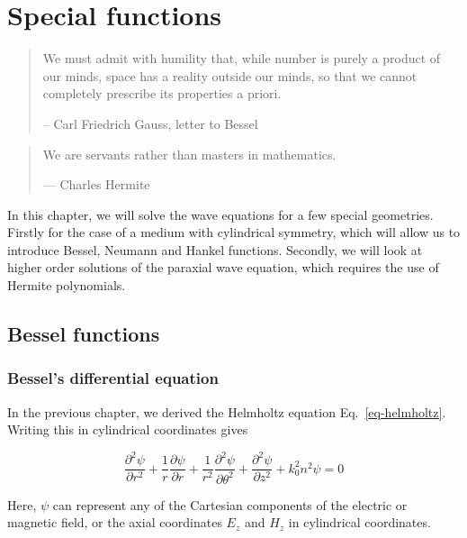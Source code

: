 \setcounter{chapter}{1} %

\chapter{Special functions}
\label{h:special}

\begin{quote}
We must admit with humility that, while number is purely a product of our minds, space has a reality outside our minds, so that we cannot completely prescribe its properties a priori.

-- Carl Friedrich Gauss, letter to Bessel
\end{quote}

\begin{quote}
We are servants rather than masters in mathematics.

--- Charles Hermite
\end{quote}

\minitoc

In this chapter, we will solve the wave equations for a few special geometries. Firstly for the case of a medium with cylindrical symmetry, which will allow us to introduce Bessel, Neumann and Hankel functions. Secondly, we will look at higher order solutions of the paraxial wave equation, which requires the use of Hermite polynomials.

\section{Bessel functions}

\subsection{Bessel's differential equation}\label{sec-bessel-eq}

In the previous chapter, we derived the Helmholtz equation Eq.~\ref{eq-helmholtz}. Writing this in cylindrical coordinates gives

\begin{equation}
\frac{\partial^2 \psi}{\partial r^2} + \frac{1}{r} \frac{\partial \psi}{\partial r} +\frac{1}{r^2} \frac{\partial^2 \psi}{\partial \theta^2} + \frac{\partial^2 \psi}{\partial z^2} + k_0^2 n^2\psi = 0 \label{eq-helmholtz-cyl}
\end{equation}

Here, $\psi$ can represent any of the Cartesian components of the electric or magnetic field, or the axial coordinates $E_z$ and $H_z$ in cylindrical coordinates.


